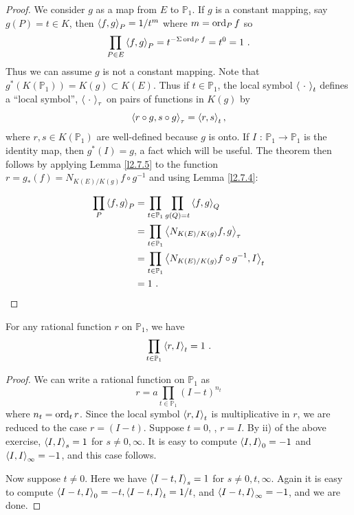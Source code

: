 \begin{proof}
We consider $g$ as a map from $E$ to $\mathbb{P}_{1}$. If $g$ is a constant mapping, say $g(P)=t \in K$, then $\left\langle f,g \right \rangle_{P} = 1/t^{m}$ where $m=\operatorname{ord}_{P}f$ so
$$
\prod_{P\in E}\left\langle f,g \right \rangle_{P}=t^{-\Sigma \operatorname{ord}_{P}f}=t^{0}=1\ .
$$
Thus we can assume $g$ is not a constant mapping. Note that $g^{*}(K(\mathbb{P}_{1}))= K(g)\subset K(E)$. Thus if $t \in \mathbb{P}_{1}$, the local symbol $\left\langle \ \cdot\  \right \rangle_{t}$ defines a ``local symbol'', $\ts{\ \cdot\ }_{\tau}$ on pairs of functions in $K(g)$ by
$$
\left\langle r\circ g,s\circ g \right \rangle_{\tau}=\left\langle r,s \right \rangle_{t},
$$
where $r,s\in K(\mathbb{P}_{1})$ are well-defined because $g$ is onto. If $I$ : $\mathbb{P}_{1}\rightarrow \mathbb{P}_{1}$ is the identity map, then $g^{*}(I)=g$, a fact which will be useful. The theorem then follows by applying Lemma \ref{l2.7.5} to the function $r=g_{*}(f)= N_{K(E)/K(g)}f\circ g^{-1}$ and using Lemma \ref{l2.7.4}:

\begin{align*}
\prod_{P} \left\langle f,g \right \rangle_{P} &= \prod_{t\in \mathbb{P}_{1}}\prod_{g(Q)=t} \left\langle f,g \right \rangle_{Q} \\
&= \prod_{t\in \mathbb{P}_{1}} \left\langle N_{K(E)/K(g)}f,g \right \rangle_{\tau} \\
&= \prod_{t\in \mathbb{P}_{1}} \left\langle N_{K(E)/K(g)}f\circ g^{-1},I \right \rangle_{t}\\
&=1\ .
\end{align*}


\end{proof}

\begin{lem}
\label{l2.7.5}
For any rational function $r$ on $\mathbb{P}_{1}$, we have
$$
\prod_{t\in \mathbb{P}_{1}}\left\langle r,I \right \rangle_{t}=1\ .
$$
\end{lem}

\begin{proof}
We can write a rational function on $\mathbb{P}_{1}$ as
$$
r=a\prod_{t\in \mathbb{P}_{1}}(I-t)^{n_{t}}
$$
where $n_{t}=\operatorname{ord}_{t} r$. Since the local symbol $\left\langle r, I \right \rangle_{t}$ is multiplicative in $r$, we are reduced to the case $r= (I -t)$. Suppose $t =0$, \ie, $r=I$. By ii) of the above exercise, $\left\langle I, I \right \rangle_{s}=1$ for $s\neq 0,\infty$. It is easy to compute $\left\langle I, I \right \rangle_{0}=-1$ and $\left\langle I, I \right \rangle_{\infty}=-1$, and this case follows.

Now suppose $t\neq 0$. Here we have $\left\langle I-t, I \right \rangle_{s}=1$ for $s\neq 0, t, \infty$. Again it is easy to compute $\left\langle I -t, I \right \rangle_{0}=-t, \left\langle I-t, I \right \rangle_{t}=1/t$, and $\left\langle I-t, I \right \rangle_{\infty}=-1$, and we are done.
\end{proof}

